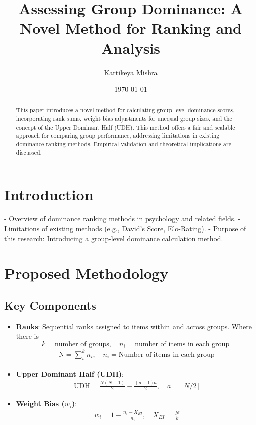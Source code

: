 \documentclass[12pt]{article}
\title{Assessing Group Dominance: A Novel Method for Ranking and Analysis}
\author{Kartikeya Mishra}
\date{\today}
\begin{document}
	
	\maketitle
	
	\begin{abstract}
		This paper introduces a novel method for calculating group-level dominance scores, incorporating rank sums, weight bias adjustments for unequal group sizes, and the concept of the Upper Dominant Half (UDH). This method offers a fair and scalable approach for comparing group performance, addressing limitations in existing dominance ranking methods. Empirical validation and theoretical implications are discussed.
	\end{abstract}
		
		\section{Introduction}
		- Overview of dominance ranking methods in psychology and related fields.
		- Limitations of existing methods (e.g., David's Score, Elo-Rating).
		- Purpose of this research: Introducing a group-level dominance calculation method.
		
		\section{Proposed Methodology}
		\subsection{Key Components}
		\begin{itemize}
			\item \textbf{Ranks}: Sequential ranks assigned to items within and across groups. Where there is \[k = \text{number of groups}, \quad n_i = \text{number of items in each group }\]
			\begin{align}
				\text{N} = \sum\limits_i^k n_i, \quad  n_i = \text{Number of items in each group}
			\end{align}
			\item \textbf{Upper Dominant Half (UDH)}:
			\begin{align}
				\text{UDH} = \frac{N(N+1)}{2} - \frac{(a-1)a}{2}, \quad a = \lceil N/2 \rceil
			\end{align}
			\item \textbf{Weight Bias ($w_i$)}:
			\begin{align}
				w_i = 1 - \frac{n_i - X_{EI}}{n_i}, \quad X_{EI} = \frac{N}{k}
			\end{align}
		\end{itemize}
		
\end{document}
